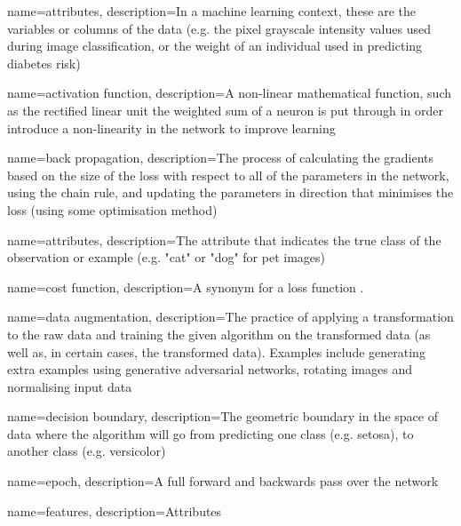 
{
    name=attributes,
    description={In a machine learning context, these are the variables or columns of the data (e.g. the pixel grayscale intensity values used during image classification, or the weight of an individual used in predicting diabetes risk)}
}

{
    name=activation function,
    description={A non-linear mathematical function, such as the rectified linear unit the weighted sum of a neuron is put through in order introduce a non-linearity in the network to improve learning}
}

{
    name=back propagation,
    description={The process of calculating the gradients based on the size of the loss with respect to all of the parameters in the network, using the chain rule, and updating the parameters in direction that minimises the loss (using some optimisation method)}
}

{
    name=attributes,
    description={The attribute that indicates the true class of the observation or example (e.g. "cat" or "dog" for pet images)}
}

{
    name={cost function},
    description={A synonym for a loss function \cite[p.~80]{good_fellow_2016}.}
}

{
    name=data augmentation,
    description={The practice of applying a transformation to the raw data and training the given algorithm on the transformed data (as well as, in certain cases, the transformed data). Examples include generating extra examples using generative adversarial networks, rotating images and normalising input data}
}

{
    name=decision boundary,
    description={The geometric boundary in the space of data where the algorithm will go from predicting one class (e.g. setosa), to another class (e.g. versicolor)}
}

{
    name=epoch,
    description={A full forward and backwards pass over the network}
}

{
    name=features,
    description={Attributes}
}

